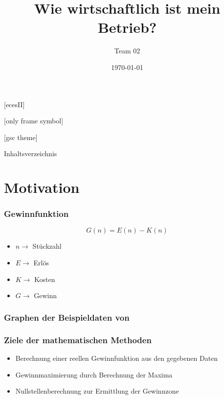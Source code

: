 \documentclass[table]{beamer}
\title[Wirtschaftlichkeit]{ Wie wirtschaftlich ist mein Betrieb? \\
\footnotesize\sf {Denis Andri\'{c}, Bastian Koch, Dirk Schweickard}}
\author[Denis Andri\'{c} | Bastian Koch | Dirk Schweickard ]{Team 02}
\date[]{\today}
\begin{document}
[ecesII]

[only frame symbol]

[gsc theme]

\setcounter{tocdepth}{1}
\begin{frame}{Inhaltsverzeichnis}
\tableofcontents
\end{frame}
\setcounter{tocdepth}{2}

\section{Motivation}
	\begin{frame}
	\frametitle{Gewinnfunktion}
 		\begin{equation}
 		\nonumber
 			G(n)=E(n)-K(n)
 		\end{equation}
 		\begin{itemize}
 			\item $n \to$ Stückzahl
 			\item $E \to$ Erlös
 			\item $K \to$ Kosten
 			\item $G \to$ Gewinn 
 		\end{itemize}
	\end{frame}
	\begin{frame}
	\frametitle{Graphen der Beispieldaten von \cite{Sonar.2001}}
		\begin{figure}[h]
			\centering
		\end{figure}
	\end{frame}
	\begin{frame}
	\frametitle{Ziele der mathematischen Methoden}
		\begin{itemize}[<+->]
			\item Berechnung einer reellen Gewinnfunktion aus den gegebenen Daten
			\item Gewinnmaximierung durch Berechnung der Maxima
			\item Nullstellenberechnung zur Ermittlung der Gewinnzone
		\end{itemize}
	\end{frame}
\end{document}
